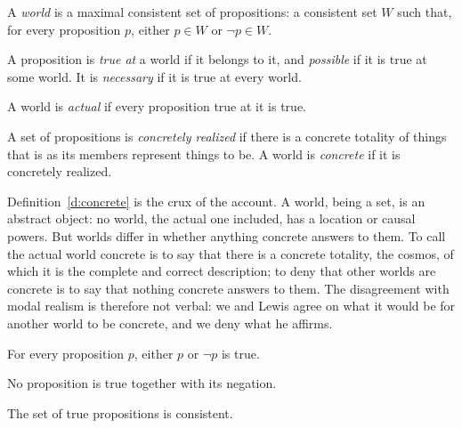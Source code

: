 \documentclass{situationist-preprint}
\begin{document}
\begin{definition}[World]\label{d:world}
A \emph{world} is a maximal consistent set of propositions: a consistent set $W$ such that, for every proposition $p$, either $p\in W$ or $\neg p\in W$.
\end{definition}

\begin{definition}\label{d:poss}
A proposition is \emph{true at} a world if it belongs to it, and \emph{possible} if it is true at some world. It is \emph{necessary} if it is true at every world.
\end{definition}

\begin{definition}[Actuality]\label{d:actual}
A world is \emph{actual} if every proposition true at it is true.
\end{definition}

\begin{definition}[Concreteness]\label{d:concrete}
A set of propositions is \emph{concretely realized} if there is a concrete totality of things that is as its members represent things to be. A world is \emph{concrete} if it is concretely realized.
\end{definition}

Definition~\ref{d:concrete} is the crux of the account. A world, being a set, is an abstract object: no world, the actual one included, has a location or causal powers. But worlds differ in whether anything concrete answers to them. To call the actual world concrete is to say that there is a concrete totality, the cosmos, of which it is the complete and correct description; to deny that other worlds are concrete is to say that nothing concrete answers to them. The disagreement with modal realism is therefore not verbal: we and Lewis agree on what it would be for another world to be concrete, and we deny what he affirms.

\begin{assumption}[Bivalence]\label{a:biv}
For every proposition $p$, either $p$ or $\neg p$ is true.
\end{assumption}

\begin{assumption}[Noncontradiction]\label{a:nc}
No proposition is true together with its negation.
\end{assumption}

\begin{assumption}\label{a:tc}
The set of true propositions is consistent.
\end{assumption}
\end{document}
